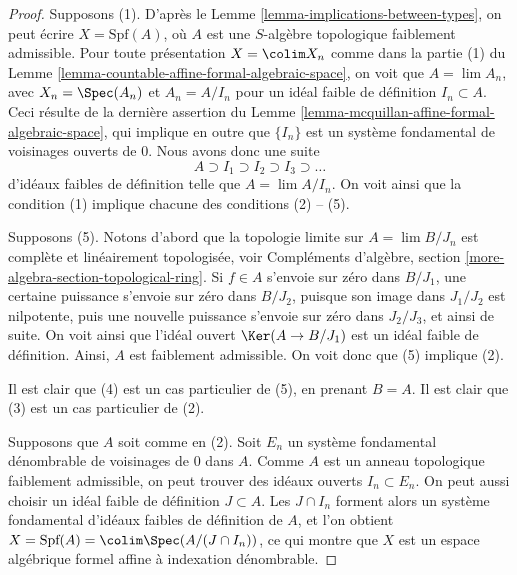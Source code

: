 \begin{proof}
Supposons (1). D'après le Lemme \ref{lemma-implications-between-types},
on peut écrire $X = \text{Spf}(A)$, où $A$ est une $S$-algèbre topologique
faiblement admissible. Pour toute présentation $X = \colim X_n$ comme dans la
partie (1) du Lemme \ref{lemma-countable-affine-formal-algebraic-space},
on voit que $A = \lim A_n$, avec $X_n = \Spec(A_n)$ et
$A_n = A/I_n$ pour un idéal faible de définition $I_n \subset A$.
Ceci résulte de la dernière assertion du
Lemme \ref{lemma-mcquillan-affine-formal-algebraic-space},
qui implique en outre que $\{I_n\}$ est un système fondamental
de voisinages ouverts de $0$. Nous avons donc une suite
$$
A \supset I_1 \supset I_2 \supset I_3 \supset \ldots
$$
d'idéaux faibles de définition telle que $A = \lim A/I_n$. On voit ainsi
que la condition (1) implique chacune des conditions (2) -- (5).

\medskip\noindent
Supposons (5). Notons d'abord que la topologie limite sur
$A = \lim B/J_n$ est complète et linéairement topologisée, voir
Compléments d'algèbre, section \ref{more-algebra-section-topological-ring}.
Si $f \in A$ s'envoie sur zéro dans $B/J_1$, une certaine puissance s'envoie sur zéro
dans $B/J_2$, puisque son image dans $J_1/J_2$ est nilpotente, puis une nouvelle
puissance s'envoie sur zéro dans $J_2/J_3$, et ainsi de suite. On voit ainsi que
l'idéal ouvert $\Ker(A \to B/J_1)$ est un idéal faible de définition.
Ainsi, $A$ est faiblement admissible. On voit donc que (5) implique (2).

\medskip\noindent
Il est clair que (4) est un cas particulier de (5), en prenant $B = A$.
Il est clair que (3) est un cas particulier de (2).

\medskip\noindent
Supposons que $A$ soit comme en (2). Soit $E_n$ un système fondamental dénombrable
de voisinages de $0$ dans $A$. Comme $A$ est un anneau topologique faiblement
admissible, on peut trouver des idéaux ouverts $I_n \subset E_n$.
On peut aussi choisir un idéal faible de définition $J \subset A$.
Les $J \cap I_n$ forment alors un système fondamental d'idéaux faibles de définition
de $A$, et l'on obtient
$X = \text{Spf}(A) = \colim \Spec(A/(J \cap I_n))$,
ce qui montre que $X$ est un espace algébrique formel affine à indexation dénombrable.
\end{proof}

